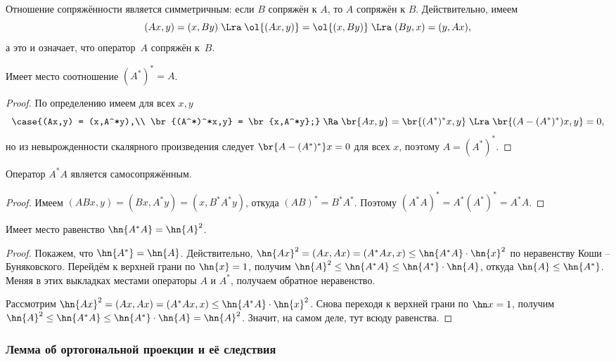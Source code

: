 \documentclass[a4paper]{article}
\begin{document}
Отношение сопряжённости является симметричным: если $B$ сопряжён к $A$, то $A$ сопряжён к $B$.
Действительно, имеем
$$(Ax,y) = (x,By) \; \Lra \; \ol{(Ax,y)} = \ol{(x,By)} \; \Lra \; (By,x) = (y,Ax),$$
а это и означает, что оператор~$A$ сопряжён к~$B$.

\begin{stm}
Имеет место соотношение $(A^*)^* = A$.
\end{stm}
\begin{proof}
По определению имеем для всех $x,y$
$$\case{(Ax,y) = (x,A^*y),\\ \br{(A^*)^*x,y} = \br{x,A^*y};} \;\Ra \; \br{Ax,y} = \br{(A^*)^*x,y}
\; \Lra \; \br{(A-(A^*)^*)x, y} = 0,$$
но из невырожденности скалярного произведения следует $\br{A-(A^*)^*}x = 0$ для всех $x$,
поэтому $A = (A^*)^*$.
\end{proof}

\begin{stm}
Оператор $A^*A$ является самосопряжённым.
\end{stm}
\begin{proof}
Имеем $(ABx,y) = (Bx,A^*y) = (x,B^*A^*y)$, откуда $(AB)^* = B^*A^*$. Поэтому
$(A^*A)^* = A^*(A^*)^* = A^*A$.
\end{proof}

\begin{lemma}
Имеет место равенство $\hn{A^*A} = \hn{A}^2$.
\end{lemma}
\begin{proof}
Покажем, что $\hn{A^*} = \hn{A}$. Действительно, $\hn{Ax}^2 = (Ax,Ax) = (A^*Ax,x) \le \hn{A^*A}\cdot\hn{x}^2$
по неравенству Коши -- Буняковского.
Перейдём к верхней грани по $\hn{x} = 1$, получим
$\hn{A}^2 \le \hn{A^*A} \le \hn{A^*} \cdot \hn{A}$, откуда $\hn{A} \le \hn{A^*}$.
Меняя в этих выкладках местами операторы $A$ и $A^*$, получаем обратное неравенство.

Рассмотрим $\hn{Ax}^2 = (Ax,Ax) = (A^*Ax,x) \le \hn{A^*A}\cdot\hn{x}^2$. Снова
переходя к верхней грани по $\hn x = 1$, получим
$\hn{A}^2 \le \hn{A^*A} \le \hn{A^*} \cdot\hn{A} =  \hn{A}^2$. Значит, на самом деле,
тут всюду равенства.
\end{proof}

\subsubsection{Лемма об ортогональной проекции и её следствия}
\end{document}
